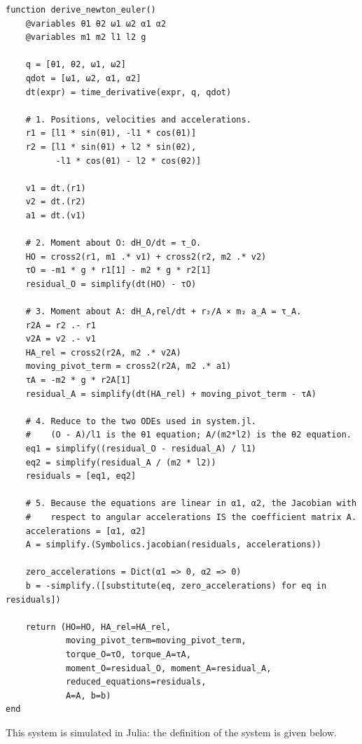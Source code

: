 \begin{verbatim}
function derive_newton_euler()
    @variables θ1 θ2 ω1 ω2 α1 α2
    @variables m1 m2 l1 l2 g

    q = [θ1, θ2, ω1, ω2]
    qdot = [ω1, ω2, α1, α2]
    dt(expr) = time_derivative(expr, q, qdot)

    # 1. Positions, velocities and accelerations.
    r1 = [l1 * sin(θ1), -l1 * cos(θ1)]
    r2 = [l1 * sin(θ1) + l2 * sin(θ2),
          -l1 * cos(θ1) - l2 * cos(θ2)]

    v1 = dt.(r1)
    v2 = dt.(r2)
    a1 = dt.(v1)

    # 2. Moment about O: dH_O/dt = τ_O.
    HO = cross2(r1, m1 .* v1) + cross2(r2, m2 .* v2)
    τO = -m1 * g * r1[1] - m2 * g * r2[1]
    residual_O = simplify(dt(HO) - τO)

    # 3. Moment about A: dH_A,rel/dt + r₂/A × m₂ a_A = τ_A.
    r2A = r2 .- r1
    v2A = v2 .- v1
    HA_rel = cross2(r2A, m2 .* v2A)
    moving_pivot_term = cross2(r2A, m2 .* a1)
    τA = -m2 * g * r2A[1]
    residual_A = simplify(dt(HA_rel) + moving_pivot_term - τA)

    # 4. Reduce to the two ODEs used in system.jl.
    #    (O - A)/l1 is the θ1 equation; A/(m2*l2) is the θ2 equation.
    eq1 = simplify((residual_O - residual_A) / l1)
    eq2 = simplify(residual_A / (m2 * l2))
    residuals = [eq1, eq2]

    # 5. Because the equations are linear in α1, α2, the Jacobian with
    #    respect to angular accelerations IS the coefficient matrix A.
    accelerations = [α1, α2]
    A = simplify.(Symbolics.jacobian(residuals, accelerations))

    zero_accelerations = Dict(α1 => 0, α2 => 0)
    b = -simplify.([substitute(eq, zero_accelerations) for eq in residuals])

    return (HO=HO, HA_rel=HA_rel,
            moving_pivot_term=moving_pivot_term,
            torque_O=τO, torque_A=τA,
            moment_O=residual_O, moment_A=residual_A,
            reduced_equations=residuals,
            A=A, b=b)
end
\end{verbatim}

This system is simulated in Julia: the definition of the system is given below.

